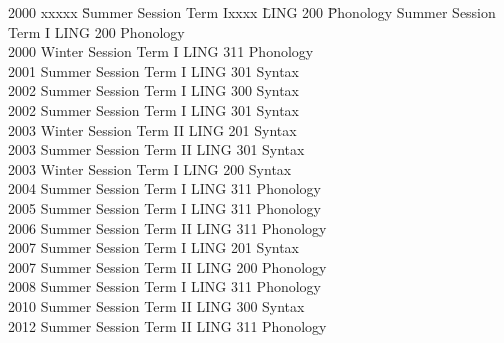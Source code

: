 \documentclass[11pt]{article}
\begin{document}
\begin{tabbing}
                                2000 xxxxx \= Summer Session Term Ixxxx \=  LING 200 \= Phonology     \>        Summer Session Term I  \> LING 200 \> Phonology \\
                                2000  \>     Winter Session Term I  \>  LING 311 \> Phonology \\
                                2001   \>    Summer Session Term I  \>  LING 301 \> Syntax \\
                                2002    \>   Summer Session Term I  \>  LING 300 \> Syntax \\
                                2002    \>   Summer Session Term I  \>  LING 301 \> Syntax \\
                                2003    \>   Winter Session Term II \>  LING 201 \> Syntax \\
                                2003    \>   Summer Session Term II \>  LING 301 \> Syntax \\
                                2003    \>   Winter Session Term I  \>  LING 200 \> Syntax \\
                                2004    \>    Summer Session Term I \>  LING 311 \> Phonology \\ 
                                2005    \>    Summer Session Term I \>  LING 311 \> Phonology \\
                                2006    \>    Summer Session Term II \>  LING 311 \> Phonology \\
                                2007    \>    Summer Session Term I \>  LING 201 \> Syntax \\
                                2007    \>    Summer Session Term II \>  LING 200 \> Phonology \\
                                2008    \>    Summer Session Term I \>  LING 311 \> Phonology \\
                                2010    \>    Summer Session Term II \>  LING 300 \> Syntax \\
                                2012    \>    Summer Session Term II \>  LING 311 \> Phonology \\

\end{tabbing}
%
%
%
\end{document}

